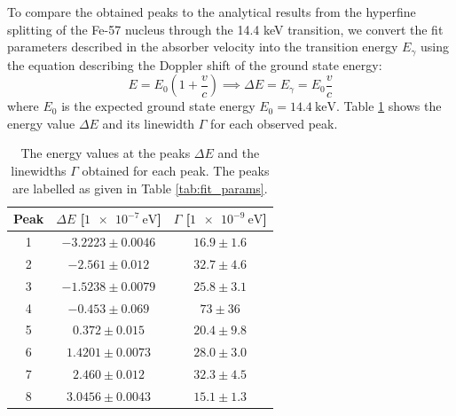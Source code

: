 \documentclass[a4paper]{report}
\numberwithin{equation}{section}
\begin{document}

To compare the obtained peaks to the analytical results from the hyperfine splitting of the Fe-57 nucleus through the 14.4 keV
transition, we convert the fit parameters described in the absorber velocity into the transition energy $E_\gamma$ using the 
equation describing the Doppler shift of the ground state energy: 
\begin{equation}
    E = E_0 \left(1 + \frac{v}{c}\right) \implies \Delta E = E_\gamma = E_0\frac{v}{c}
\end{equation}
where $E_0$ is the expected ground state energy $E_0 = \SI{14.4}{\kilo\electronvolt}$. Table \ref{tab:energy_params} shows the energy value $\Delta E$ and its 
linewidth $\Gamma$ for each observed peak. 

\begin{table}[!ht]
    \centering
    \begin{tabular}{|c|c|c|}
    \hline  
        Peak & $\Delta E$ [$\SI{1e-7}{\electronvolt}$] & $\Gamma$ [$\SI{1e-9}{\electronvolt}$] \\ \hline
        1 &$-3.2223 \pm 0.0046$ & $16.9 \pm 1.6$ \\ \hline
        2 &$-2.561 \pm 0.012$ &   $32.7 \pm 4.6$ \\ \hline
        3 &$-1.5238 \pm 0.0079$ &   $25.8 \pm 3.1$ \\ \hline
        4 &$-0.453 \pm 0.069$ &   $73 \pm 36 $ \\ \hline
        5 &$ 0.372 \pm 0.015$ &   $20.4 \pm 9.8$ \\ \hline
        6 &$ 1.4201 \pm 0.0073$ & $28.0 \pm 3.0$ \\ \hline
        7 &$ 2.460 \pm 0.012$ &   $32.3 \pm 4.5$ \\ \hline
        8 &$ 3.0456 \pm 0.0043$ & $15.1 \pm 1.3$ \\ \hline
    \end{tabular}
    \caption{The energy values at the peaks $\Delta E$ and the linewidths $\Gamma$ obtained for each peak. The peaks are 
    labelled as given in Table \ref{tab:fit_params}.}
\label{tab:energy_params}
\end{table}
\end{document}
